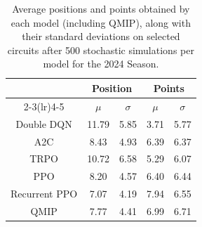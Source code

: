 \begin{table}[H]
\centering
\begin{tabular}{ccccc}
\toprule
\multicolumn{1}{l}{}               & \multicolumn{2}{c}{Position}   & \multicolumn{2}{c}{Points} \\ \cmidrule(lr){2-3}\cmidrule(lr){4-5}
\multicolumn{1}{c}{Model}          &    $\mu$ & $\sigma$ &   $\mu$  & $\sigma$ \\ \midrule
\multicolumn{1}{c}{Double DQN    } &    11.79  &     5.85  &     3.71  &     5.77  \\
\multicolumn{1}{c}{A2C           } &     8.43  &     4.93  &     6.39  &     6.37  \\
\multicolumn{1}{c}{TRPO          } &    10.72  &     6.58  &     5.29  &     6.07  \\
\multicolumn{1}{c}{PPO           } &     8.20  &     4.57  &     6.40  &     6.44  \\
\multicolumn{1}{c}{Recurrent PPO } &     7.07  &     4.19  &     7.94  &     6.55  \\
\multicolumn{1}{c}{QMIP          } &     7.77  &     4.41  &     6.99  &     6.71  \\
\bottomrule
\end{tabular}
\caption{Average positions and points obtained by each model (including QMIP), along with their standard deviations on selected circuits after 500 stochastic simulations per model for the 2024 Season.}
\label{tab:tab_qmip_vs_drl_stochastic_2024}
\end{table}